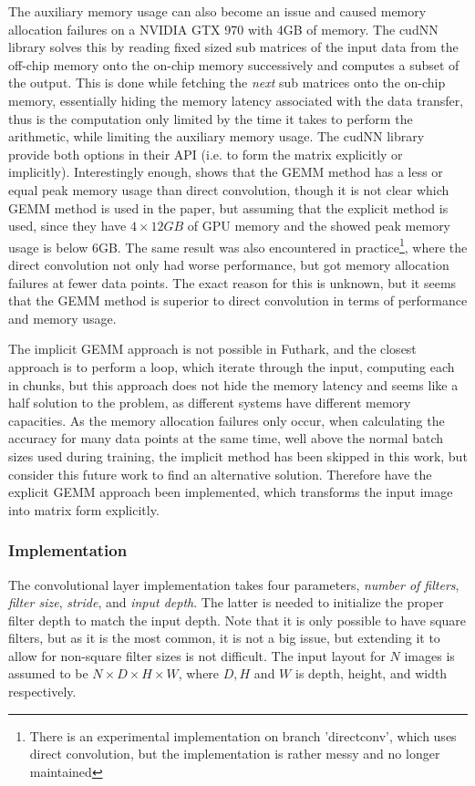 The auxiliary memory usage can also become an issue and caused memory allocation
failures on a NVIDIA GTX 970 with 4GB of memory. 
The cudNN library solves this by reading fixed sized sub matrices of the input
data from the off-chip memory onto the on-chip memory successively and computes
a subset of the output. 
This is done while fetching the \emph{next} sub matrices onto the on-chip
memory, essentially hiding the memory latency associated with the data transfer,
thus is the computation only limited by the time it takes to perform the
arithmetic, while limiting the auxiliary memory usage\cite[p.
5]{DBLP:journals/corr/ChetlurWVCTCS14}. 
The cudNN library provide both options in their API (i.e. to form the matrix
explicitly or implicitly). 
Interestingly enough, \cite{Performance} shows that the GEMM method has a less
or equal peak memory usage than direct convolution, though it is not clear which
GEMM method is used in the paper, but assuming that the explicit method is used,
since they have $4 \times 12GB$ of GPU memory and the showed peak memory usage
is below 6GB. 
The same result was also encountered in practice\footnote{There is an
	experimental implementation on branch 'directconv', which uses direct
	convolution, but the implementation is rather messy and no longer maintained},
where the direct convolution not only had worse performance, but got memory
allocation failures at fewer data points. 
The exact reason for this is unknown, but it seems that the GEMM method is
superior to direct convolution in terms of performance and memory usage. 

The implicit GEMM approach is not possible in Futhark, and the closest approach
is to perform a loop, which iterate through the input, computing each in chunks,
but this approach does not hide the memory latency and seems like a half
solution to the problem, as different systems have different memory capacities. 
As the  memory allocation failures only occur, when calculating the accuracy for
many data points at the same time, well above the normal batch sizes used during
training, the implicit method has been skipped in this work, but consider this
future work to find an alternative solution. \newline 
Therefore have the explicit GEMM approach been implemented, which transforms the
input image into matrix form explicitly.

\subsubsection{Implementation}
The convolutional layer implementation takes four parameters, \emph{number of
	filters}, \emph{filter size}, \emph{stride}, and \emph{input depth}. 
The latter is needed to initialize the proper filter depth to match the input
depth. 
Note that it is only possible to have square filters, but as it is the most
common, it is not a big issue, but extending it to allow for non-square filter
sizes is not difficult. 
The input layout for $N$ images is assumed to be $N \times D \times H \times W$,
where $D,H$ and $W$ is depth, height, and width respectively. 

